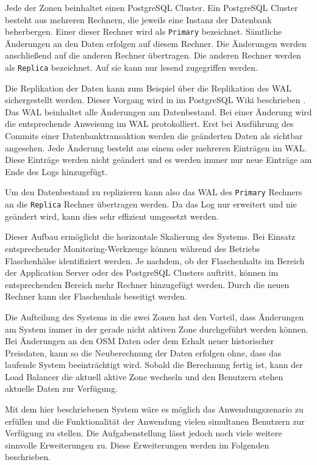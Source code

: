 \documentclass[
ngerman          %
,a4paper          %
,11pt
,pdftex
]{report}
\begin{document}
Jede der Zonen beinhaltet einen PostgreSQL Cluster. Ein PostgreSQL Cluster besteht aus mehreren Rechnern, die jeweils eine Instanz der Datenbank beherbergen. Einer dieser Rechner wird als \texttt{Primary} bezeichnet. Sämtliche Änderungen an den Daten erfolgen auf diesem Rechner. Die Änderungen werden anschließend auf die anderen Rechner übertragen. Die anderen Rechner werden als \texttt{Replica} bezeichnet. Auf sie kann nur lesend zugegriffen werden.

Die Replikation der Daten kann zum Beispiel über die Replikation des \ac{WAL} sichergestellt werden. Dieser Vorgang wird in im PostgreSQL Wiki beschrieben \cite{pgwiki}. Das \ac{WAL} beinhaltet alle Änderungen am Datenbestand. Bei einer Änderung wird die entsprechende Anweisung im \ac{WAL} protokolliert. Erst bei Ausführung des Commits einer Datenbanktransaktion werden die geänderten Daten als sichtbar angesehen. Jede Änderung besteht aus einem oder mehreren Einträgen im \ac{WAL}. Diese Einträge werden nicht geändert und es werden immer nur neue Einträge am Ende des Logs hinzugefügt.

Um den Datenbestand zu replizieren kann also das \ac{WAL} des \texttt{Primary} Rechners an die \texttt{Replica} Rechner übertragen werden. Da das Log nur erweitert und nie geändert wird, kann dies sehr effizient umgesetzt werden.

Dieser Aufbau ermöglicht die horizontale Skalierung des Systems. Bei Einsatz entsprechender Monitoring-Werkzeuge können während des Betriebs Flaschenhälse identifiziert werden. Je nachdem, ob der Flaschenhalts im Bereich der Application Server oder des PostgreSQL Clusters auftritt, können im entsprechenden Bereich mehr Rechner hinzugefügt werden. Durch die neuen Rechner kann der Flaschenhals beseitigt werden.

Die Aufteilung des Systems in die zwei Zonen hat den Vorteil, dass Änderungen am System immer in der gerade nicht aktiven Zone durchgeführt werden können. Bei Änderungen an den \ac{OSM} Daten oder dem Erhalt neuer historischer Preisdaten, kann so die Neuberechnung der Daten erfolgen ohne, dass das laufende System beeinträchtigt wird. Sobald die Berechnung fertig ist, kann der Load Balancer die aktuell aktive Zone wechseln und den Benutzern stehen aktuelle Daten zur Verfügung.

Mit dem hier beschriebenen System wäre es möglich das Anwendungszenario zu erfüllen und die Funktionalität der Anwendung vielen simultanen Benutzern zur Verfügung zu stellen. Die Aufgabenstellung lässt jedoch noch viele weitere sinnvolle Erweiterungen zu. Diese Erweiterungen werden im Folgenden beschrieben.
\end{document}
